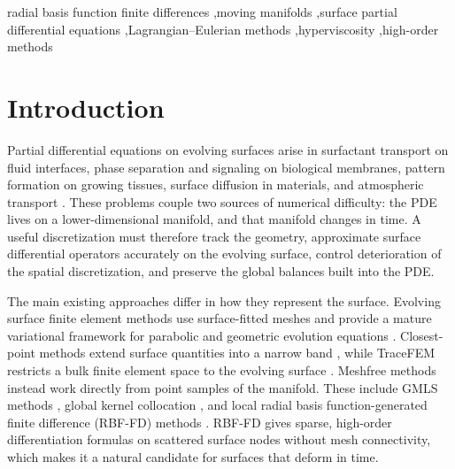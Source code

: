\documentclass[a4paper,fleqn]{cas-sc}
\begin{document}
\begin{keywords}
radial basis function finite differences \sep moving manifolds \sep surface partial differential equations \sep Lagrangian--Eulerian methods \sep hyperviscosity \sep high-order methods
\end{keywords}

\maketitle

\section{Introduction}
\label{sec:intro}

Partial differential equations on evolving surfaces arise in surfactant transport on fluid interfaces, phase separation and signaling on biological membranes, pattern formation on growing tissues, surface diffusion in materials, and atmospheric transport
\cite{Stone1990,XuZhaoLowengrub2006,ElliottStinner2010,RaetzRoeger2014,BarreiraElliottMadzvamuse2011,EilksElliott2008,Pudykiewicz2006,DziukElliott2013}.
These problems couple two sources of numerical difficulty: the PDE lives on a lower-dimensional manifold, and that manifold changes in time. A useful discretization must therefore track the geometry, approximate surface differential operators accurately on the evolving surface, control deterioration of the spatial discretization, and preserve the global balances built into the PDE.

The main existing approaches differ in how they represent the surface. Evolving surface finite element methods use surface-fitted meshes and provide a mature variational framework for parabolic and geometric evolution equations
\cite{DziukElliott2007EvolvingSurfaces,DziukElliott2007SurfaceFiniteElements,dziuk_fully_2012,DziukElliott2013,LubichMansourVenkataraman2013BDFEvolving,elliott_evolving_2015,kovacs_convergent_2019,elliott_unified_2021}.
Closest-point methods extend surface quantities into a narrow band
\cite{RuuthMerriman2008,MacdonaldRuuth2010,MarzMacdonald2012}, while TraceFEM restricts a bulk finite element space to the evolving surface
\cite{olshanskii_finite_2009,olshanskii_stabilized_2014,olshanskii_eulerian_2014,olshanskii_trace_2017_static,OlshanskiiXu2017TraceFEM,LehrenfeldOlshanskiiXu2018TraceFEM,grande_analysis_2018}.
Meshfree methods instead work directly from point samples of the manifold. These include GMLS methods
\cite{LiangZhao2013,TraskKuberry2020,GrossTraskKuberryAtzberger2020,JonesBoslerKuberryWright2023,hangelbroek2026sla}, global kernel collocation
\cite{fuselier2013highorder,ChenLing2020Extrinsic,ChenLing2020KernelHeatTransport}, and local radial basis function-generated finite difference (RBF-FD) methods
\cite{piret2012orthogonal,shankar2015rbffdSurfaces,lehto2017rbfcompact,shankar_rbf-loi_2018,petras_rbf-fd_2018,PetrasLingPiretRuuth2019LSRBFCPM,ShankarWrightNarayan2020,JonesBoslerKuberryWright2023,wright2023mgm}.
RBF-FD gives sparse, high-order differentiation formulas on scattered surface nodes without mesh connectivity, which makes it a natural candidate for surfaces that deform in time.
\end{document}
